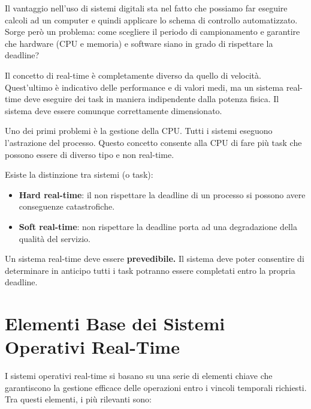\documentclass[11pt,a4paper]{report}
\begin{document}
Il vantaggio nell'uso di sistemi digitali sta nel fatto che possiamo far eseguire calcoli ad un computer e quindi applicare lo schema di controllo automatizzato. Sorge però un problema: come scegliere il periodo di campionamento e garantire che hardware (CPU e memoria) e software siano in grado di rispettare la deadline?

Il concetto di real-time è completamente diverso da quello di velocità. Quest'ultimo è indicativo delle performance e di valori medi, ma un sistema real-time deve eseguire dei task in maniera indipendente dalla potenza fisica. Il sistema deve essere comunque correttamente dimensionato.

Uno dei primi problemi è la gestione della CPU. Tutti i sistemi eseguono l'astrazione del processo. Questo concetto consente alla CPU di fare più task che possono essere di diverso tipo e non real-time.

Esiste la distinzione tra sistemi (o task):
\begin{itemize}
    \item \textbf{Hard real-time}: il non rispettare la deadline di un processo si possono avere conseguenze catastrofiche.
    \item \textbf{Soft real-time}: non rispettare la deadline porta ad una degradazione della qualità del servizio.
\end{itemize}

Un sistema real-time deve essere \textbf{prevedibile.} Il sistema deve poter consentire di determinare in anticipo tutti i task potranno essere completati entro la propria deadline.

\section{Elementi Base dei Sistemi Operativi Real-Time}

I sistemi operativi real-time si basano su una serie di elementi chiave che garantiscono la gestione efficace delle operazioni entro i vincoli temporali richiesti. Tra questi elementi, i più rilevanti sono:
\end{document}
